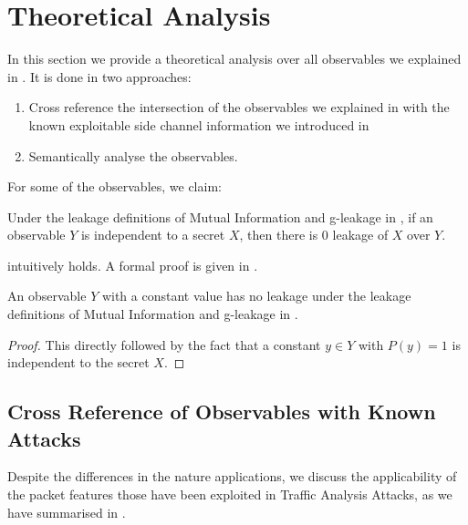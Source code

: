 \section{Theoretical Analysis} \label{Sec: Theoretical Analysis}

In this section we provide a theoretical analysis over all observables we explained in . It is done in two approaches:

\begin{enumerate}
	\item Cross reference the intersection of the observables we explained in  with the known exploitable side channel information we introduced in 
	\item Semantically analyse the observables. 
\end{enumerate}


For some of the observables, we claim:

\begin{theorem} \label{Te: IR}
Under the leakage definitions of Mutual Information and g-leakage in , if an observable $Y$ is independent to a secret $X$, then there is $0$ leakage of $X$ over $Y$.
\end{theorem}

 intuitively holds. A formal proof is given in .

\begin{corollary} \label{Cor: Constant Leakage}
	An observable $Y$ with a constant value has no leakage under the leakage definitions of  Mutual Information and g-leakage in .
\end{corollary}

\begin{proof}
	This directly followed by the fact that a constant $y \in Y$ with $P(y) = 1$ is independent to the secret $X$.
\end{proof}

\subsection{Cross Reference of Observables with Known Attacks} \label{Subsec: Cross Reference}

Despite the differences in the nature applications, we discuss the applicability of the packet features those have been exploited in Traffic Analysis Attacks, as we have summarised in .

